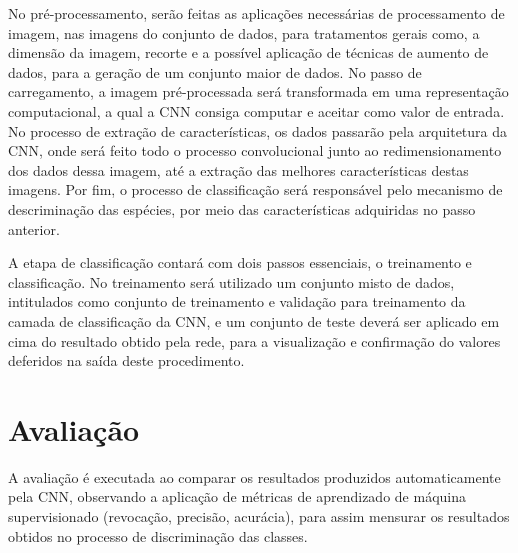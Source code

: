 \documentclass[
	12pt,				%
	oneside,			%
	a4paper,			%
	english,			%
	brazil				%
	]{abntex2ppgsi}
\begin{document}
No pré-processamento, serão feitas as aplicações necessárias de processamento de imagem, nas imagens do conjunto de dados, para tratamentos gerais como, a dimensão da imagem, recorte e a possível aplicação de técnicas de aumento de dados, para a geração de um conjunto maior de dados. No passo de carregamento, a imagem pré-processada será transformada em uma representação computacional, a qual a CNN consiga computar e aceitar como valor de entrada. No processo de extração de características, os dados passarão pela arquitetura da CNN, onde será feito todo o processo convolucional junto ao redimensionamento dos dados dessa imagem, até a extração das melhores características destas imagens. Por fim, o processo de classificação será responsável pelo mecanismo de descriminação das espécies, por meio das características adquiridas no passo anterior.

A etapa de classificação contará com dois passos essenciais, o treinamento e classificação. No treinamento será utilizado um conjunto misto de dados, intitulados como conjunto de treinamento e validação para treinamento da camada de classificação da CNN, e um conjunto de teste deverá ser aplicado em cima do resultado obtido pela rede, para a visualização e confirmação do valores deferidos na saída deste procedimento.

\section{Avaliação}
A avaliação é executada ao comparar os resultados produzidos automaticamente pela CNN, observando a aplicação de métricas de aprendizado de máquina supervisionado (revocação, precisão, acurácia), para assim mensurar os resultados obtidos no processo de discriminação das classes.

\end{document}
